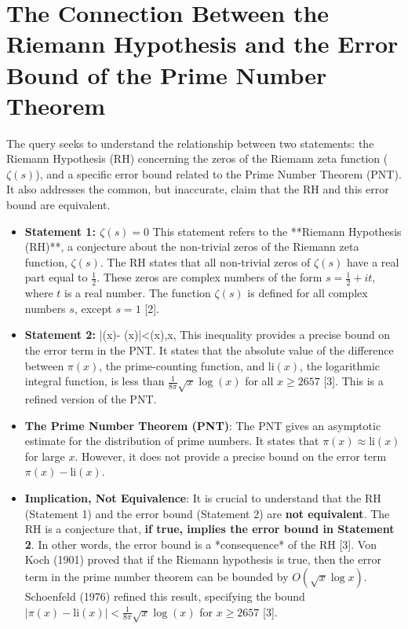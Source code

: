 \documentclass{article}
\begin{document}
\section*{The Connection Between the Riemann Hypothesis and the Error Bound of the Prime Number Theorem}

The query seeks to understand the relationship between two statements: the Riemann Hypothesis (RH) concerning the zeros of the Riemann zeta function (\(\zeta(s)\)), and a specific error bound related to the Prime Number Theorem (PNT). It also addresses the common, but inaccurate, claim that the RH and this error bound are equivalent.

\begin{itemize}
    \item \textbf{Statement 1: \( \zeta(s) = 0 \)} This statement refers to the **Riemann Hypothesis (RH)**, a conjecture about the non-trivial zeros of the Riemann zeta function, \( \zeta(s) \). The RH states that all non-trivial zeros of  \( \zeta(s) \) have a real part equal to \(\frac{1}{2}\). These zeros are complex numbers of the form \( s = \frac{1}{2} + it \), where \( t \) is a real number.  The function  \( \zeta(s) \) is defined for all complex numbers \(s\), except \(s=1\) [2].

    \item \textbf{Statement 2:}  
    {\displaystyle |\pi (x)- (x)|<{}{}\log(x),x,} This inequality provides a precise bound on the error term in the PNT. It states that the absolute value of the difference between \(\pi(x)\), the prime-counting function, and  \(\text{li}(x)\), the logarithmic integral function, is less than  \(\frac{1}{8\pi} \sqrt{x} \log(x)\) for all \(x \geq 2657\) [3]. This is a refined version of the PNT.

    \item \textbf{The Prime Number Theorem (PNT)}: The PNT gives an asymptotic estimate for the distribution of prime numbers. It states that \(\pi(x) \approx \text{li}(x)\) for large \(x\). However, it does not provide a precise bound on the error term \( \pi(x) - \text{li}(x) \).

   \item  \textbf{Implication, Not Equivalence}: It is crucial to understand that the RH (Statement 1) and the error bound (Statement 2) are \textbf{not equivalent}. The RH is a conjecture that, \textbf{if true, implies the error bound in Statement 2}. In other words, the error bound is a *consequence* of the RH [3]. Von Koch (1901) proved that if the Riemann hypothesis is true, then the error term in the prime number theorem can be bounded by \( O(\sqrt{x} \log x) \). Schoenfeld (1976) refined this result, specifying the bound \( |\pi(x) - \text{li}(x)| < \frac{1}{8\pi} \sqrt{x} \log(x) \) for \( x \geq 2657 \) [3].
    

\end{itemize}
\end{document}
